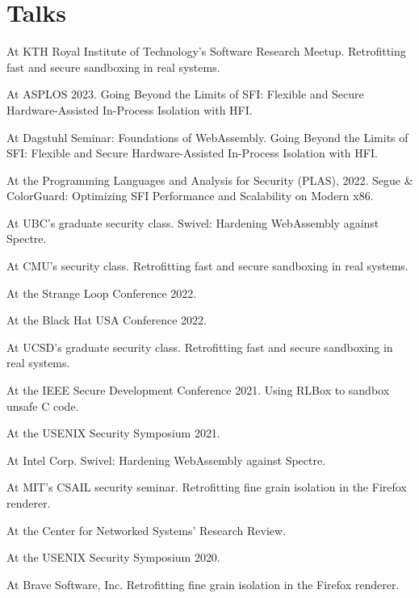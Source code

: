 \section{Talks}

{ At KTH Royal Institute of Technology's Software Research Meetup.
Retrofitting fast and secure sandboxing in real systems.
}

{ At ASPLOS 2023.
Going Beyond the Limits of SFI: Flexible and Secure Hardware-Assisted In-Process Isolation with HFI.
}

{ At Dagstuhl Seminar:
{Foundations of WebAssembly}. Going Beyond the Limits of SFI: Flexible and
Secure Hardware-Assisted In-Process Isolation with HFI. }

{ At the Programming Languages and Analysis for Security (PLAS), 2022. Segue \&
ColorGuard: Optimizing SFI Performance and Scalability on Modern x86. }

{ At UBC's graduate security class. Swivel: Hardening WebAssembly against
Spectre. }

{ At CMU's security class. Retrofitting fast and secure sandboxing in real
systems. }

{ At the Strange Loop Conference 2022.
}

{ At the Black Hat USA Conference 2022.
}

{ At UCSD's graduate security class. Retrofitting fast and secure sandboxing in
real systems. }

{ At the IEEE Secure Development Conference 2021. Using RLBox to sandbox unsafe C
code. }

{ At the USENIX Security Symposium 2021.
}

{ At Intel Corp. Swivel: Hardening WebAssembly against Spectre. }

{ At MIT's CSAIL security seminar. Retrofitting fine grain isolation in the
Firefox renderer. }

{ At the Center for Networked Systems' Research Review.
}

{ At the USENIX Security Symposium 2020.
}

{ At Brave Software, Inc. Retrofitting fine grain isolation in the Firefox
renderer. }
